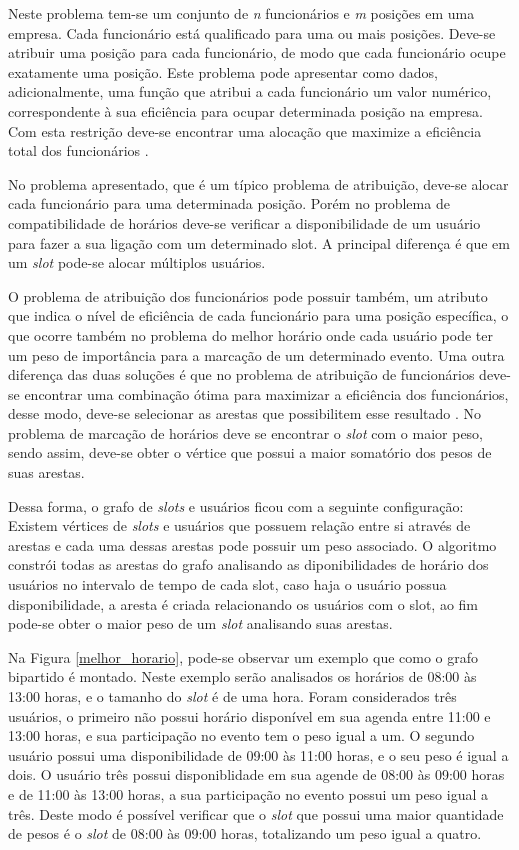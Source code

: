 Neste problema tem-se um conjunto de \textit{n} funcionários e \textit{m} posições em uma empresa. Cada funcionário está qualificado para uma ou mais posições. Deve-se atribuir uma posição para cada funcionário, de modo que cada funcionário ocupe exatamente uma posição. Este problema pode apresentar como dados, adicionalmente, uma função que atribui a cada funcionário um valor numérico, correspondente à sua eficiência para ocupar determinada posição na empresa. Com esta restrição deve-se encontrar uma alocação que maximize a eficiência total dos funcionários \cite{Figuerado:Szwarcfiter:1999}.

No problema apresentado, que é um típico problema de atribuição, deve-se alocar cada funcionário para uma determinada posição. Porém no problema de compatibilidade de horários deve-se verificar a disponibilidade de um usuário para fazer a sua ligação com um determinado slot. A principal diferença é que em um \textit{slot} pode-se alocar múltiplos usuários.

O problema de atribuição dos funcionários pode possuir também, um atributo que indica o nível de eficiência de cada funcionário para uma posição específica, o que ocorre também no problema do melhor horário onde cada usuário pode ter um peso de importância para a marcação de um determinado evento. Uma outra diferença das duas soluções é que no problema de atribuição de funcionários deve-se encontrar uma combinação ótima para maximizar a eficiência dos funcionários, desse modo, deve-se selecionar as arestas que possibilitem esse resultado \cite{Figuerado:Szwarcfiter:1999}. No problema de marcação de horários deve se encontrar o \textit{slot} com o maior peso, sendo assim, deve-se obter o vértice que possui a maior somatório dos pesos de suas arestas.

Dessa forma, o grafo de \textit{slots} e usuários ficou com a seguinte configuração: Existem vértices de \textit{slots} e usuários que possuem relação entre si através de arestas e cada uma dessas arestas pode possuir um peso associado. O algoritmo constrói todas as arestas do grafo analisando as diponibilidades de horário dos usuários no intervalo de tempo de cada slot, caso haja o usuário possua disponibilidade, a aresta é criada relacionando os usuários com o slot, ao fim pode-se obter o maior peso de um \textit{slot} analisando suas arestas.

Na Figura \ref{melhor_horario}, pode-se observar um exemplo que como o grafo bipartido é montado. Neste exemplo serão analisados os horários de 08:00 às 13:00 horas, e o tamanho do \textit{slot} é de uma hora. Foram considerados três usuários, o primeiro não possui horário disponível em sua agenda entre 11:00 e 13:00 horas, e sua participação no evento tem o peso igual a um. O segundo usuário possui uma disponibilidade de 09:00 às 11:00 horas, e o seu peso é igual a dois. O usuário três possui disponiblidade em sua agende de 08:00 às 09:00 horas e de 11:00 às 13:00 horas, a sua participação no evento possui um peso igual a três. Deste modo é possível verificar que o \textit{slot} que possui uma maior quantidade de pesos é o \textit{slot} de 08:00 às 09:00 horas, totalizando um peso igual a quatro.

